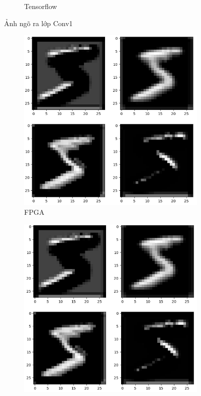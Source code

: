 \begin{figure}[H]
\begin{subfigure}[b]{0.45\linewidth}
        \caption{Tensorflow}
        \label{fig:enter-label}
    \end{subfigure}
    \caption{Ảnh ngõ ra lớp Conv1}
    \label{fig:main}
\end{figure}

\begin{figure}[H]
\centering
    \begin{subfigure}[b]{0.45\linewidth}
        \includegraphics[width=1\linewidth]{Images/fpgac2.png}
        \caption{FPGA}
        \label{fig:enter-label}
    \end{subfigure}
    \begin{subfigure}[b]{0.45\linewidth}
        \includegraphics[width=1\linewidth]{Images/cnnc2.png}

\end{subfigure}
\end{figure}

